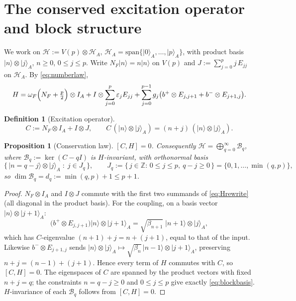 \documentclass[12pt]{article}
\newtheorem{proposition}{Proposition}
\theoremstyle{definition}
\newtheorem{definition}{Definition}
\theoremstyle{remark}
\newcommand{\ket}[1]{\lvert #1\rangle}
\newcommand{\bp}{b^{+}}
\newcommand{\bm}{b^{-}}
\newcommand{\HA}{\mathcal{H}_A}
\begin{document}
\section{The conserved excitation operator and block structure}

We work on $\mathcal{H}:=V(p)\otimes\HA$, $\HA=\mathrm{span}\{\ket0_A,\dots,\ket p_A\}$,
with product basis $\ket{n}\otimes\ket{j}_A$, $n\ge0$, $0\le j\le p$. Write
$N_F\ket n=n\ket n$ on $V(p)$ and $J:=\sum_{j=0}^{p} j\,E_{jj}$ on $\HA$.
By \eqref{eq:numberlaw},
\begin{equation}\label{eq:Hrewrite}
H=\omega_F\Bigl(N_F+\tfrac p2\Bigr)\otimes I_A
+I\otimes\sum_{j=0}^{p}\varepsilon_j E_{jj}
+\sum_{j=0}^{p-1} g_j\bigl(\bp\otimes E_{j,j+1}+\bm\otimes E_{j+1,j}\bigr).
\end{equation}

\begin{definition}[Excitation operator]
\[
C:=N_F\otimes I_A+I\otimes J,\qquad C\,(\ket n\otimes\ket j_A)=(n+j)\,(\ket n\otimes\ket j_A).
\]
\end{definition}

\begin{proposition}[Conservation law]\label{prop:conserved}
$[C,H]=0$. Consequently $\mathcal H=\bigoplus_{q=0}^{\infty}\mathcal B_q$, where
$\mathcal B_q:=\ker(C-qI)$ is $H$-invariant, with orthonormal basis
\begin{equation}\label{eq:blockbasis}
\bigl\{\,\ket{n=q-j}\otimes\ket{j}_A\;:\;j\in J_q\,\bigr\},\qquad
J_q:=\{\,j\in\mathbb Z:\,0\le j\le p,\ q-j\ge0\,\}=\{0,1,\dots,\min(q,p)\},
\end{equation}
so $\dim\mathcal B_q=d_q:=\min(q,p)+1\le p+1$.
\end{proposition}

\begin{proof}
$N_F\otimes I_A$ and $I\otimes J$ commute with the first two summands of
\eqref{eq:Hrewrite} (all diagonal in the product basis). For the coupling, on a
basis vector $\ket{n}\otimes\ket{j+1}_A$:
\[
\bigl(\bp\otimes E_{j,j+1}\bigr)\ket n\otimes\ket{j+1}_A
=\sqrt{\beta_{n+1}}\;\ket{n+1}\otimes\ket{j}_A,
\]
which has $C$-eigenvalue $(n+1)+j=n+(j+1)$, equal to that of the input. Likewise
$\bm\otimes E_{j+1,j}$ sends $\ket n\otimes\ket{j}_A\mapsto\sqrt{\beta_n}\,\ket{n-1}\otimes\ket{j+1}_A$,
preserving $n+j=(n-1)+(j+1)$. Hence every term of $H$ commutes with $C$, so
$[C,H]=0$. The eigenspaces of $C$ are spanned by the product vectors with fixed
$n+j=q$; the constraints $n=q-j\ge0$ and $0\le j\le p$ give exactly
\eqref{eq:blockbasis}. $H$-invariance of each $\mathcal B_q$ follows from $[C,H]=0$.
\end{proof}
\end{document}

